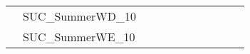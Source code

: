 \begin{table}[]
{\begin{tabular}{|c|l|ll|ll|ll|l|l|l|}
			& SUC\_SummerWD\_10             &                                   &                                  &                           &                          &                           &                          &                                       &                               & \\
			& SUC\_SummerWE\_10             &                                   &                                  &                           &                          &                           &                          &                                       &                               & \\
			\hline
		\end{tabular}%
	}
\end{table}


